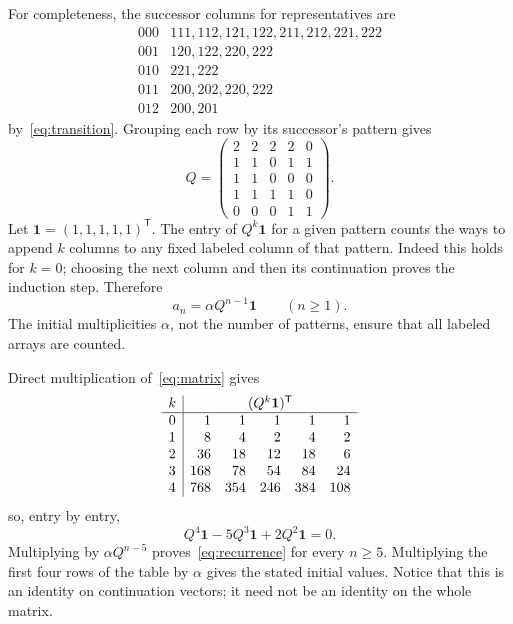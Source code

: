 \documentclass[11pt,a4paper]{article}
\newcommand{\ones}{\boldsymbol{1}}
\begin{document}
For completeness, the successor columns for representatives are
\[
\begin{array}{c|l}
000 & 111,112,121,122,211,212,221,222\\
001 & 120,122,220,222\\
010 & 221,222\\
011 & 200,202,220,222\\
012 & 200,201
\end{array}
\]
by~\eqref{eq:transition}. Grouping each row by its successor's pattern gives
\begin{equation}\label{eq:matrix}
 Q=\begin{pmatrix}
 2&2&2&2&0\\
 1&1&0&1&1\\
 1&1&0&0&0\\
 1&1&1&1&0\\
 0&0&0&1&1
 \end{pmatrix}.
\end{equation}
Let \(\ones=(1,1,1,1,1)^{\mathsf T}\). The entry of
\(Q^k\ones\) for a given pattern counts the ways to append \(k\) columns
to any fixed labeled column of that pattern. Indeed this holds for
\(k=0\); choosing the next column and then its continuation proves the
induction step. Therefore
\begin{equation}\label{eq:count}
 a_n=\alpha Q^{n-1}\ones\qquad(n\ge1).
\end{equation}
The initial multiplicities \(\alpha\), not the number of patterns, ensure
that all labeled arrays are counted.

Direct multiplication of~\eqref{eq:matrix} gives
\[
\begin{array}{c|rrrrr}
k & \multicolumn{5}{c}{(Q^k\ones)^{\mathsf T}}\\\hline
0&1&1&1&1&1\\
1&8&4&2&4&2\\
2&36&18&12&18&6\\
3&168&78&54&84&24\\
4&768&354&246&384&108
\end{array}
\]
so, entry by entry,
\begin{equation}\label{eq:identity}
 Q^4\ones-5Q^3\ones+2Q^2\ones=0.
\end{equation}
Multiplying by \(\alpha Q^{n-5}\) proves~\eqref{eq:recurrence} for
every \(n\ge5\). Multiplying the first four rows of the table by
\(\alpha\) gives the stated initial values. Notice that this is an identity
on continuation vectors; it need not be an identity on the whole matrix.
\end{document}
